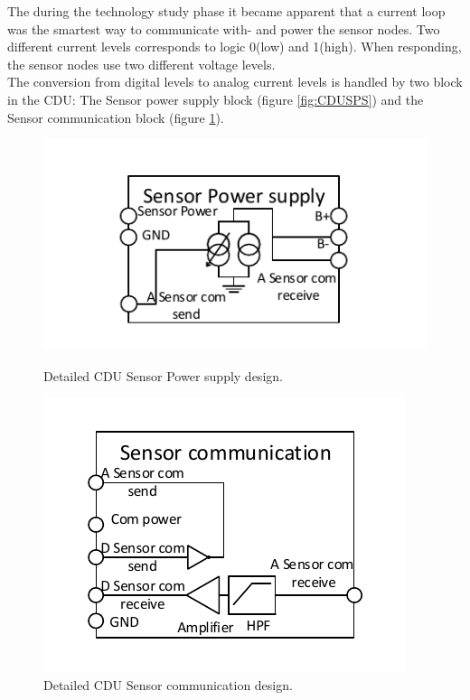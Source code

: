 The during the technology study phase it became apparent that a current loop was the smartest way to communicate with- and power the sensor nodes. Two different current levels corresponds to logic 0(low) and 1(high). When responding, the sensor nodes use two different voltage levels.\\
The conversion from digital levels to analog current levels is handled by two block in the CDU: The Sensor power supply block (figure \ref{fig:CDUSPS}) and the Sensor communication block (figure \ref{fig:CDUSC}).
\begin{figure}[htbp]
	\begin{minipage}[b]{0.45\linewidth}
	\centering
	\includegraphics[scale=1]{billeder/11ProjectDescription/CDUSPS}
	\caption{Detailed CDU Sensor Power supply design.}
	\label{fig:CDUSPS}
	\end{minipage}
	\hspace{0.5cm}
	\begin{minipage}[b]{0.45\linewidth}
	\centering
	\includegraphics[scale=1]{billeder/11ProjectDescription/CDUSC}
	\caption{Detailed CDU Sensor communication design.}
	\label{fig:CDUSC}
	\end{minipage}
\end{figure}
